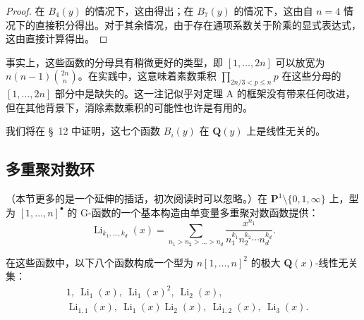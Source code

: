 \begin{proof}
在 $B_4(y)$ 的情况下，这由得出；在 $B_7(y)$ 的情况下，这由自 $n=4$ 情况下的直接积分得出。对于其余情况，由于存在通项系数关于阶乘的显式表达式，这由直接计算得出。
\end{proof}

\begin{remark}\label{rem:10.2.3}
事实上，这些函数的分母具有稍微更好的类型，即 $[1, \dots, 2n]$ 可以放宽为 $n(n-1)\binom{2n}{n}$。在实践中，这意味着素数乘积 $\prod_{2n/3 < p \le n} p$ 在这些分母的 $[1, \dots, 2n]$ 部分中是缺失的。这一注记似乎对定理 A 的框架没有带来任何改进，但在其他背景下，消除素数乘积的可能性也许是有用的。
\end{remark}

我们将在 \S~12 中证明，这七个函数 $B_i(y)$ 在 $\mathbf{Q}(y)$ 上是线性无关的。

\subsection{多重聚对数环}\label{sec:10.3}

（本节更多的是一个延伸的插话，初次阅读时可以忽略。）在 $\mathbf{P}^1 \setminus \{0,1,\infty\}$ 上，型为 $[1,\dots,n]^{\bullet}$ 的 G-函数的一个基本构造由单变量多重聚对数函数提供：
\begin{equation}\label{eq:10.3.1}\tag{10.3.1}
\operatorname{Li}_{k_1,\dots,k_d}(x) = \sum_{n_1 > n_2 > \dots > n_d} \frac{x^{n_1}}{n_1^{k_1} n_2^{k_2} \cdots n_d^{k_d}}.
\end{equation}

在这些函数中，以下八个函数构成一个型为 $n[1, \dots, n]^2$ 的极大 $\mathbf{Q}(x)$-线性无关集：
\begin{equation}\label{eq:10.3.2}\tag{10.3.2}
\begin{aligned}
&1, \ \operatorname{Li}_1(x), \ \operatorname{Li}_1(x)^2, \ \operatorname{Li}_2(x), \\
&\operatorname{Li}_{1,1}(x), \ \operatorname{Li}_1(x) \operatorname{Li}_2(x), \ \operatorname{Li}_{1,2}(x), \ \operatorname{Li}_3(x).
\end{aligned}
\end{equation}

